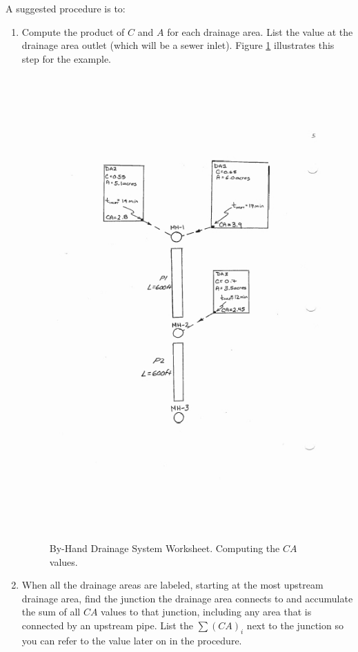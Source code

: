 \documentclass[12pt]{article}
\begin{document}
A suggested procedure is to: ~\newpage
\begin{enumerate}
\item Compute the product of $C$ and $A$ for each drainage area.
List the value at the drainage area outlet (which will be a sewer inlet).
Figure \ref{fig:DrainageLayout5} illustrates this step for the example.
\begin{figure}[ht!] %
\centering
   \includegraphics[height=7in]{DrainageLayout5.jpg}
   \caption{By-Hand Drainage System Worksheet. Computing the $CA$ values.}
   \label{fig:DrainageLayout5} 
\end{figure}
\clearpage
\item When all the drainage areas are labeled, starting at the most upstream drainage area, find the junction the drainage area connects to and accumulate the sum of all $CA$ values to that junction, including any area that is connected by an upstream pipe.   
List the $\sum (CA)_i$ next to the junction so you can refer to the value later on in the procedure.

\end{enumerate}
\end{document}
